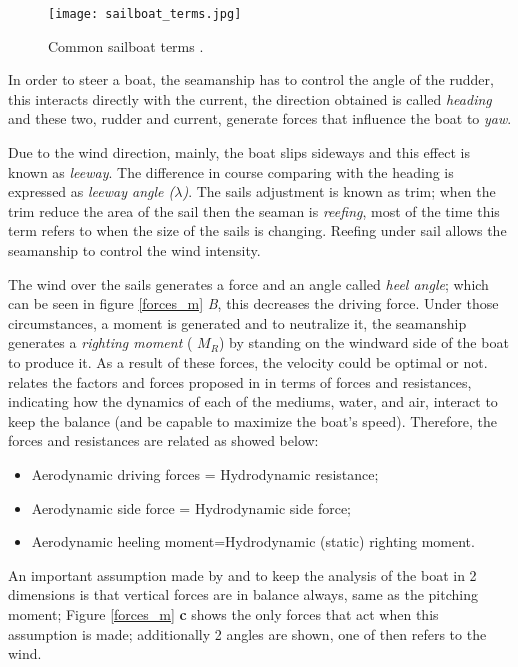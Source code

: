  \begin{figure}%
\centering
  \texttt{[image: sailboat\_terms.jpg]}
 \caption{Common sailboat terms \cite{sailboat_terms}. }
\label{sailboat_terms}
\end{figure}
In order to steer a boat, the seamanship has to control the angle of the rudder, this interacts directly with the current, the direction obtained is called \textit{heading} and these two, rudder and current, generate forces that influence the boat to \textit{yaw}. \par
Due to the wind direction, mainly, the boat slips sideways and this effect is known as \textit{leeway}. The difference in course comparing with the heading is expressed as \textit{leeway angle ($\lambda$)}. %
The sails adjustment is known as trim; when the trim reduce the area of the sail then the seaman is \textit{reefing}, most of the time this term refers to when the size of the sails is changing.  Reefing under sail allows the seamanship to control the wind intensity. \par
{}
The wind over the sails generates a force and an angle called \textit{heel angle}; which can be seen in figure \ref{forces_m} \textit{B}, this decreases the driving force. Under those circumstances, a moment is generated and to neutralize it, the seamanship generates a \textit{righting moment} (\textit{ $M_{R}$}) by standing on the windward side of the boat to produce it\cite{philpott1993yacht}. 
As a result of these forces, the velocity could be optimal or not. \cite{larsonprinciples} relates the factors and forces proposed in\cite{philpott1993yacht} in terms of forces and resistances, indicating how the dynamics of each of the mediums, water, and air, interact to keep the balance (and be capable to maximize the boat's speed). Therefore, the forces and resistances are related as showed below: \par 
\begin{itemize}  \label{milgramforces}
 \setlength \itemsep{0em}
\item Aerodynamic driving forces = Hydrodynamic resistance;
\item Aerodynamic side force = Hydrodynamic side force;
\item Aerodynamic heeling moment=Hydrodynamic (static) righting moment.
\end{itemize}
An important assumption made by  \cite{philpott1993yacht} and \cite{larsonprinciples} to keep the analysis of the boat in 2 dimensions is that vertical forces are in balance always, same as the pitching moment; Figure \ref{forces_m} \textbf{c} shows the only forces that act when this assumption is made; additionally 2 angles are shown, one of then refers to the wind.\par
{}
